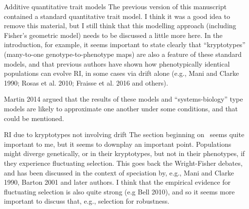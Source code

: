 
\begin{point}{Additive quantitative trait models}
%
The previous version of this manuscript contained a standard quantitative trait model. I think it was a good idea to remove this material, but I still think that this modelling approach (including Fisher’s geometric model) needs to be discussed a little more here. In the introduction, for example, it seems important to state clearly that ``kryptotypes'' (many-to-one genotype-to-phenotype maps) are also a feature of these standard models, and that previous authors have shown how phenotypically identical populations can evolve RI, in some cases via drift alone (e.g., Mani and Clarke 1990; Rosas et al. 2010; Fraisse et al. 2016 and others).

Martin 2014 argued that the results of these models and ``systems-biology'' type models are likely to approximate one another under some conditions, and that could be mentioned.
\end{point}


\begin{point}{RI due to kryptotypes not involving drift}
%
  The section beginning on ~seems quite important to me, but it seems to downplay an important point. Populations might diverge genetically, or in their kryptotypes, but not in their phenotypes, if they experience fluctuating selection. This goes back the Wright-Fisher debates, and has been discussed in the context of speciation by, e.g., Mani and Clarke 1990, Barton 2001 and later authors. I think that the empirical evidence for fluctuating selection is also quite strong (e.g Bell 2010), and so it seems more important to discuss that, e.g., selection for robustness.
\end{point}

